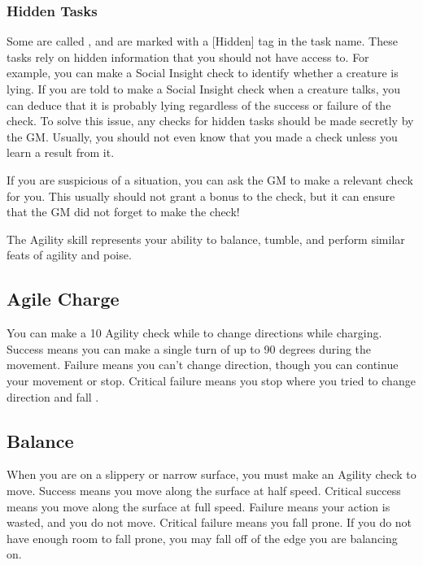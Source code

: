     \subsubsection{Hidden Tasks}\label{Hidden Tasks}
        Some  are called , and are marked with a [Hidden] tag in the task name.
        These tasks rely on hidden information that you should not have access to.
        For example, you can make a Social Insight check to identify whether a creature is lying.
        If you are told to make a Social Insight check when a creature talks, you can deduce that it is probably lying regardless of the success or failure of the check.
        To solve this issue, any checks for hidden tasks should be made secretly by the GM.\@
        Usually, you should not even know that you made a check unless you learn a result from it.

        If you are suspicious of a situation, you can ask the GM to make a relevant check for you.
        This usually should not grant a bonus to the check, but it can ensure that the GM did not forget to make the check!

\newpage
{}
        The Agility skill represents your ability to balance, tumble, and perform similar feats of agility and poise.

    \subsection{Agile Charge}
        You can make a  10 Agility check while  to change directions while charging.
        Success means you can make a single turn of up to 90 degrees during the movement.
        Failure means you can't change direction, though you can continue your movement or stop.
        Critical failure means you stop where you tried to change direction and fall \prone.

    \subsection{Balance}\label{Balance}

        When you are on a slippery or narrow surface, you must make an Agility check to move.
        Success means you move along the surface at half speed.
        Critical success means you move along the surface at full speed.
        Failure means your action is wasted, and you do not move.
        Critical failure means you fall prone.
        If you do not have enough room to fall prone, you may fall off of the edge you are balancing on.

